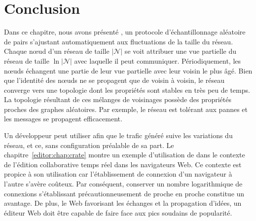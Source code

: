 
\section{Conclusion}
\label{net:sec:conclusion}

Dans ce chapitre, nous avons présenté \SPRAY, un protocole d'échantillonnage
aléatoire de pairs s'ajustant automatiquement aux fluctuations de la taille du
réseau. Chaque nœud d'un réseau de taille $|\mathcal{N}|$ se voit attribuer une
vue partielle du réseau de taille $\ln |\mathcal{N}|$ avec laquelle il peut
communiquer. Périodiquement, les nœuds échangent une partie de leur vue
partielle avec leur voisin le plus âgé. Bien que l'identité des nœuds ne se
propagent que de voisin à voisin, le réseau converge vers une topologie dont les
propriétés sont stables en très peu de temps. La topologie résultant de ces
mélanges de voisinages possède des propriétés proches des graphes
aléatoires. Par exemple, le réseau est tolérant aux pannes et les messages se
propagent efficacement.

Un développeur peut utiliser \SPRAY afin que le trafic généré suive les
variations du réseau, et ce, sans configuration préalable de sa part. Le
chapitre~\ref{editor:chap:crate} montre un exemple d'utilisation de \SPRAY dans
le contexte de l'édition collaborative temps réel dans les navigateurs Web.  Ce
contexte est propice à son utilisation car l'établissement de connexion d'un
navigateur à l'autre s'avère coûteux. Par conséquent, conserver un nombre
logarithmique de connexions s'établissant précautionneusement de proche en
proche constitue un avantage. De plus, le Web favorisant les échanges et la
propagation d'idées, un éditeur Web doit être capable de faire face aux pics
soudains de popularité.

